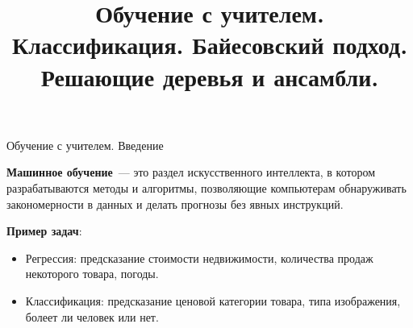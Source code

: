 \documentclass[handout]{beamer}
\title[Статистическое и машинное обучение]{Обучение с учителем. Классификация. Байесовский подход. Решающие деревья и ансамбли.}
\institute[ ]{%
	\small
	Санкт-Петербургский государственный университет\\
	Кафедра статистического моделирования
}
\date{}
\begin{document}
	
	\begin{frame}
		\titlepage
	\end{frame}

\begin{frame}{Обучение с учителем. Введение}

	{\bf Машинное обучение}~--- это раздел искусственного интеллекта, в котором разрабатываются методы и алгоритмы, позволяющие компьютерам обнаруживать закономерности в данных и делать прогнозы без явных инструкций.\bigskip

	{\bf Пример задач}: 
	\begin{itemize}
		\item Регрессия: предсказание стоимости недвижимости, количества продаж некоторого товара, погоды.
		\item Классификация: предсказание ценовой категории товара, типа изображения, болеет ли человек или нет.
	\end{itemize}
\end{frame}
\end{document}
